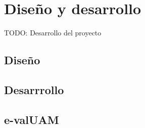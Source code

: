 \chapter{Diseño y desarrollo\label{sec:disenhoYDesarrollo}}

TODO: Desarrollo del proyecto

\section{Diseño}

\section{Desarrrollo}

\section{e-valUAM}
